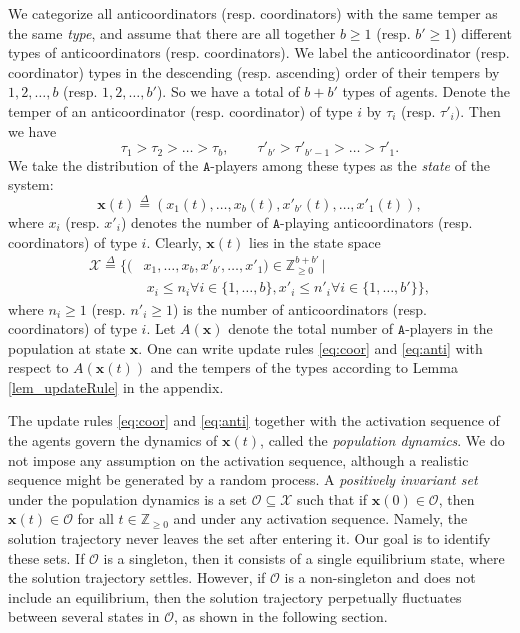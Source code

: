 \documentclass[10 pt,twocolumn,journal]{IEEEtran}
\theoremstyle{plain}
\newcommand{\A}{\mathcal{A}}
\renewcommand{\O}{\mathcal{O}}
\newcommand{\X}{\mathcal{X}}
\newcommand{\x}{\bm{x}}
\renewcommand{\A}{\mathtt{A}}
\theoremstyle{definition}
\begin{document}
We categorize all anticoordinators (resp. coordinators) with the same temper as the same \emph{type}, and assume that there are all together $b\geq1$ (resp. $b'\geq1$) different types of anticoordinators (resp. coordinators).
We label the anticoordinator (resp. coordinator) types in the descending (resp. ascending) order of their tempers by $1,2,\ldots, b$ (resp. $1,2,\ldots, b'$). 
So we have a total of $b+b'$ types of agents. 
Denote the temper of an anticoordinator (resp. coordinator) of type $i$ by $\tau_i$ (resp. $\tau'_i)$.
Then we have
\begin{equation} \label{temperOrdering}
    \tau_1 > \tau_2 >\ldots > \tau_b, \qquad
    \tau'_{b'} > \tau'_{b'-1} >\ldots > \tau'_1.
\end{equation}
We take the distribution of the $\A$-players among these types as the \textit{state} of the system:
\begin{equation*}
	\x(t) 
	\overset{\Delta}{=} \left(x_1(t),\ldots,x_b(t),x'_{b'}(t),\ldots,x'_1(t)\right),
\end{equation*}
where $x_i$ (resp. $x'_i$) denotes the number of $\A$-playing anticoordinators (resp. coordinators) of type $i$. 
Clearly, $\x(t)$ lies in the state space
\begin{equation*}
	\begin{aligned}
	\mathcal{X} \overset{\Delta}{=} 
	\Big\{ (&x_1,\ldots,x_{b},x'_{b'},\ldots,x'_1)\in     \mathbb{Z}^{b+b'}_{\geq0}\,\Big|\, \\
	&\ x_i \leq n_i \forall i \in\{1,\ldots,b\},  
	x'_i \leq n'_i \forall i\in\{1,\ldots,b'\}\Big\},
	\end{aligned}
\end{equation*}
where $n_i\geq1$ (resp. $n'_i\geq1$) is the number of anticoordinators (resp. coordinators) of type $i$.
Let $A(\x)$ denote the total number of $\A$-players in the population at state $\x$. 
One can write update rules \eqref{eq:coor} and \eqref{eq:anti} with respect to $A(\x(t))$ and the tempers of the types according to Lemma \ref{lem_updateRule} in the appendix.

The update rules \eqref{eq:coor} and \eqref{eq:anti} together with the activation sequence of the agents govern the dynamics of $\x(t)$, called the \textit{population dynamics}.
We do not impose any assumption on the activation sequence, although a realistic sequence might be generated by a random process. 
A \textit{positively invariant set} under the population dynamics is a set $\O\subseteq\X$ such that if $\x(0)\in\O$, then $\x(t)\in\O$ for all $t\in\mathbb{Z}_{\geq0}$ and under any activation sequence. 
Namely, the solution trajectory never leaves the set after entering it. 
Our goal is to identify these sets.
If $\O$ is a singleton, then it consists of a single equilibrium state, where the solution trajectory settles.
However, if $\O$ is a non-singleton and does not include an equilibrium, then the solution trajectory perpetually fluctuates between several states in $\O$, as shown in the following section.
\end{document}
